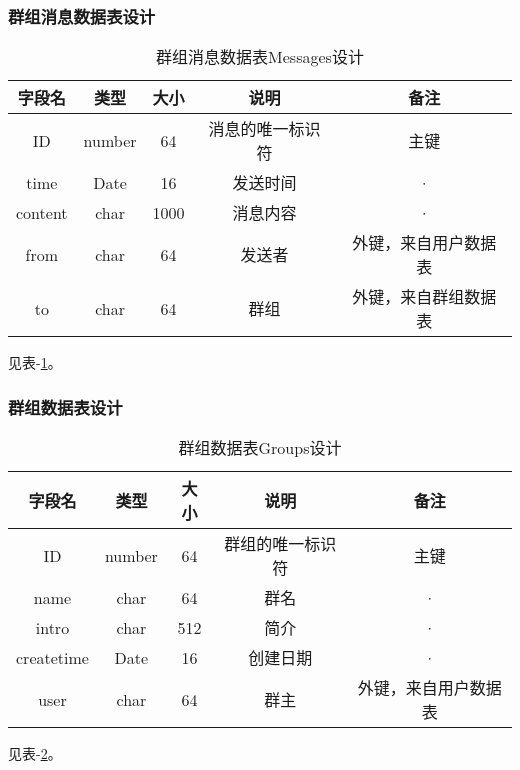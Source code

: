 \subsubsection{群组消息数据表设计}
\begin{table}[htbp]
	\centering
	\caption{群组消息数据表Messages设计} \label{tab:groupmessage-database}
	\begin{tabular}{|c|c|c|c|c|}
		\hline
		字段名  & 类型 & 大小 & 说明             & 备注                 \\
		\hline
		ID      & number & 64   & 消息的唯一标识符 & 主键                 \\
		\hline
		time    & Date & 16   & 发送时间         & ·                    \\
		\hline
		content & char & 1000 & 消息内容         & ·                    \\
		\hline
		from    & char & 64   & 发送者           & 外键，来自用户数据表 \\
		\hline
		to      & char & 64   & 群组           & 外键，来自群组数据表 \\
		\hline
	\end{tabular}
\end{table}
见表-\ref{tab:groupmessage-database}。

\subsubsection{群组数据表设计}
\begin{table}[htbp]
	\centering
	\caption{群组数据表Groups设计} \label{tab:group-database}
	\begin{tabular}{|c|c|c|c|c|}
		\hline
		字段名     & 类型 & 大小 & 说明             & 备注                 \\
		\hline
		ID         & number & 64   & 群组的唯一标识符 & 主键                 \\
		\hline
		name       & char & 64   & 群名             & ·                    \\
		\hline
		intro      & char & 512  & 简介             & ·                    \\
		\hline
		createtime & Date & 16   & 创建日期         & ·                    \\
		\hline
		user       & char & 64   & 群主             & 外键，来自用户数据表 \\
		\hline
	\end{tabular}
\end{table}
见表-\ref{tab:group-database}。

